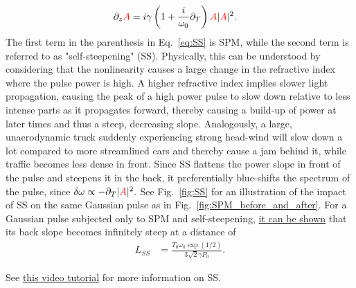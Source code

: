 \begin{align}
\label{eq:SS}
    \partial_z\textcolor{red}{A} &= i\gamma\left(1+\frac{i}{\omega_0}\partial_T \right)\textcolor{red}{A}|\textcolor{red}{A}|^2.
\end{align}
The first term in the parenthesis in Eq.~\ref{eq:SS} is SPM, while the second term is referred to as "self-steepening" (SS). Physically, this can be understood by considering that the nonlinearity causes a large change in the refractive index where the pulse power is high. A higher refractive index implies slower light propagation, causing the peak of a high power pulse to slow down relative to less intense parts as it propagates forward, thereby causing a build-up of power at later times and thus a steep, decreasing slope. Analogously, a large, unaerodynamic truck suddenly experiencing strong head-wind will slow down a lot compared to more streamlined cars and thereby cause a jam behind it, while traffic becomes less dense in front. Since SS flattens the power slope in front of the pulse and steepens it in the back, it preferentially blue-shifts the spectrum of the pulse, since $\delta\omega\propto -\partial_T|\textcolor{red}{A}|^2$. See Fig.~\ref{fig:SS} for an illustration of the impact of SS on the same Gaussian pulse as in Fig.~\ref{fig:SPM_before_and_after}. For a Gaussian pulse subjected only to SPM and self-steepening, \href{https://prefetch.eu/know/concept/self-steepening/}{it can be shown} that its back slope becomes infinitely steep at a distance of
\begin{align}
    L_{SS} &= \frac{T_0\omega_0\exp(1/2)}{3\sqrt{2}\gamma P_0}.
\end{align}


See \href{https://youtu.be/Fr6yLtGZ2To}{this video tutorial} for more information on SS. 

